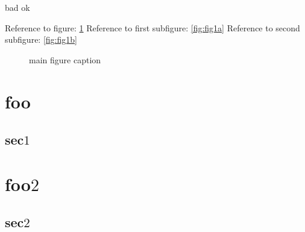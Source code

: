 \documentclass{Xarticle}
\begin{document}
\makeatletter
{}
\ifx\appendix\relax bad \else ok\fi  %

Reference to figure: \ref{fig:fig1}
Reference to first subfigure: \ref{fig:fig1a}
Reference to second subfigure: \ref{fig:fig1b}

\begin{figure}[htbp]
    \centering
    \hspace{2cm}
\par
    \caption{main figure caption}
    \label{fig:fig1}
\end{figure}

\chapter{foo}
\section[Sec]{sec$1$}
\chapter[chapter two]{foo$2$}
\section*{sec$2$}
\end{document}
